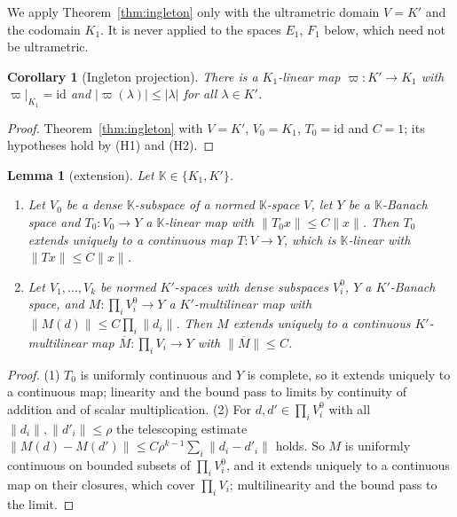 \documentclass[11pt]{amsart}
\newtheorem{lemma}[theorem]{Lemma}
\newtheorem{corollary}[theorem]{Corollary}
\theoremstyle{definition}
\theoremstyle{remark}
\numberwithin{equation}{section}
\newcommand{\id}{\mathrm{id}}
\newcommand{\abs}[1]{\lvert #1\rvert}
\newcommand{\norm}[1]{\lVert #1\rVert}
\begin{document}
We apply Theorem~\ref{thm:ingleton} only with the ultrametric domain $V=K'$ and the codomain $K_1$. It is never applied
to the spaces $E_1$, $F_1$ below, which need not be ultrametric.

\begin{corollary}[Ingleton projection]\label{cor:proj}
There is a $K_1$\nobreakdash-linear map $\varpi\colon K'\to K_1$ with $\varpi|_{K_1}=\id$ and $\abs{\varpi(\lambda)}\le\abs\lambda$ for all
$\lambda\in K'$.
\end{corollary}

\begin{proof}
Theorem~\ref{thm:ingleton} with $V=K'$, $V_0=K_1$, $T_0=\id$ and $C=1$; its hypotheses hold by (H1) and (H2).
\end{proof}

\begin{lemma}[extension]\label{lem:ext}
Let $\mathbb K\in\{K_1,K'\}$.
\begin{enumerate}
\item Let $V_0$ be a dense $\mathbb K$\nobreakdash-subspace of a normed $\mathbb K$\nobreakdash-space $V$, let $Y$ be a
$\mathbb K$\nobreakdash-Banach space and $T_0\colon V_0\to Y$ a $\mathbb K$\nobreakdash-linear map with $\norm{T_0x}\le C\norm x$. Then $T_0$ extends
uniquely to a continuous map $T\colon V\to Y$, which is $\mathbb K$\nobreakdash-linear with $\norm{Tx}\le C\norm x$.
\item Let $V_1,\dots,V_k$ be normed $K'$\nobreakdash-spaces with dense subspaces $V_i^0$, $Y$ a $K'$\nobreakdash-Banach space, and
$M\colon\prod_iV_i^0\to Y$ a $K'$\nobreakdash-multilinear map with $\norm{M(d)}\le C\prod_i\norm{d_i}$. Then $M$ extends uniquely to a
continuous $K'$\nobreakdash-multilinear map $\overline M\colon\prod_iV_i\to Y$ with $\norm{\overline M}\le C$.
\end{enumerate}
\end{lemma}

\begin{proof}
(1) $T_0$ is uniformly continuous and $Y$ is complete, so it extends uniquely to a continuous map; linearity and the
bound pass to limits by continuity of addition and of scalar multiplication. (2) For $d,d'\in\prod_iV_i^0$ with all
$\norm{d_i},\norm{d'_i}\le\rho$ the telescoping estimate
$\norm{M(d)-M(d')}\le C\rho^{k-1}\sum_i\norm{d_i-d'_i}$ holds. So $M$ is uniformly continuous on bounded subsets of
$\prod_iV_i^0$, and it extends uniquely to a continuous map on their closures, which cover $\prod_iV_i$; multilinearity
and the bound pass to the limit.
\end{proof}
\end{document}
